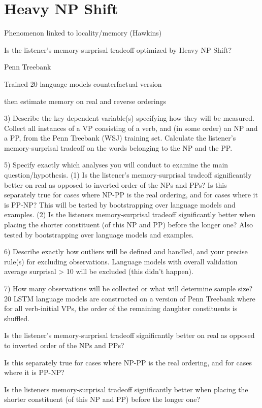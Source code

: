 \documentclass[11pt,letterpaper]{article}
\begin{document}
\section{Heavy NP Shift}


Phenomenon linked to locality/memory (Hawkins)

Is the listener's memory-surprisal tradeoff optimized by Heavy NP Shift?

Penn Treebank

Trained 20 language models counterfactual version

then estimate memory on real and reverse orderings


3) Describe the key dependent variable(s) specifying how they will be measured.
Collect all instances of a VP consisting of a verb, and (in some order) an NP and a PP, from the Penn Treebank (WSJ) training set. Calculate the listener's memory-surprisal tradeoff on the words belonging to the NP and the PP.


5) Specify exactly which analyses you will conduct to examine the main question/hypothesis.
(1) Is the listener's memory-surprisal tradeoff significantly better on real as opposed to inverted order of the NPs and PPs? Is this separately true for cases where NP-PP is the real ordering, and for cases where it is PP-NP? This will be tested by bootstrapping over language models and examples.
(2) Is the listeners memory-surprisal tradeoff significantly better when placing the shorter constituent (of this NP and PP) before the longer one?
Also tested by bootstrapping over language models and examples.

6) Describe exactly how outliers will be defined and handled, and your precise rule(s) for excluding observations.
Language models with overall validation average surprisal > 10 will be excluded (this didn't happen).

7) How many observations will be collected or what will determine sample size?
20 LSTM language models are constructed on a version of Penn Treebank where for all verb-initial VPs, the order of the remaining daughter constituents is shuffled.


Is the listener's memory-surprisal tradeoff significantly better on real as opposed to inverted order of the NPs and PPs?

Is this separately true for cases where NP-PP is the real ordering, and for cases where it is PP-NP?

Is the listeners memory-surprisal tradeoff significantly better when placing the shorter constituent (of this NP and PP) before the longer one?
\end{document}

